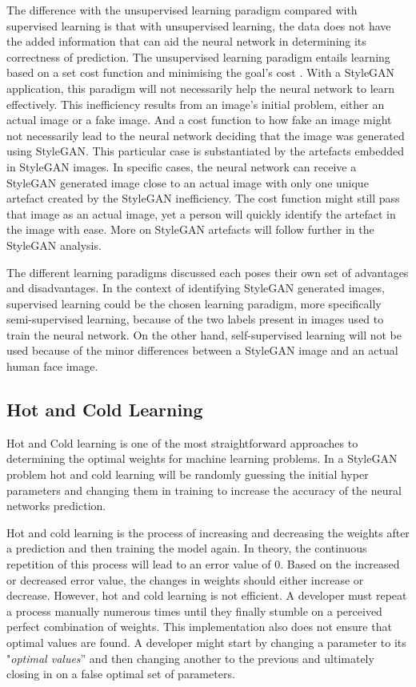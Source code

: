 The difference with the unsupervised learning paradigm compared with supervised learning is that with unsupervised learning, the data does not have the added information that can aid the neural network in determining its correctness of prediction. The unsupervised learning paradigm entails learning based on a set cost function and minimising the goal's cost \citep{Krenker2011}. With a StyleGAN application, this paradigm will not necessarily help the neural network to learn effectively. This inefficiency results from an image's initial problem, either an actual image or a fake image. And a cost function to how fake an image might not necessarily lead to the neural network deciding that the image was generated using StyleGAN. This particular case is substantiated by the artefacts embedded in StyleGAN images. In specific cases, the neural network can receive a StyleGAN generated image close to an actual image with only one unique artefact created by the StyleGAN inefficiency. The cost function might still pass that image as an actual image, yet a person will quickly identify the artefact in the image with ease. More on StyleGAN artefacts will follow further in the StyleGAN analysis.

The different learning paradigms discussed each poses their own set of advantages and disadvantages. In the context of identifying StyleGAN generated images, supervised learning could be the chosen learning paradigm, more specifically semi-supervised learning, because of the two labels present in images used to train the neural network. On the other hand, self-supervised learning will not be used because of the minor differences between a StyleGAN image and an actual human face image.

\subsection{Hot and Cold Learning}

Hot and Cold learning is one of the most straightforward approaches to determining the optimal weights for machine learning problems. In a StyleGAN problem hot and cold learning will be randomly guessing the initial hyper parameters and  changing them in training to increase the accuracy of the neural networks prediction. 

Hot and cold learning is the process of increasing and decreasing the weights after a prediction and then training the model again. In theory, the continuous repetition of this process will lead to an error value of 0. Based on the increased or decreased error value, the changes in weights should either increase or decrease. \citep{Trask2019} However, hot and cold learning is not efficient. A developer must repeat a process manually numerous times until they finally stumble on a perceived perfect combination of weights. This implementation also does not ensure that optimal values are found. A developer might start by changing a parameter to its "\textit{optimal values}” and then changing another to the previous and ultimately closing in on a false optimal set of parameters.

